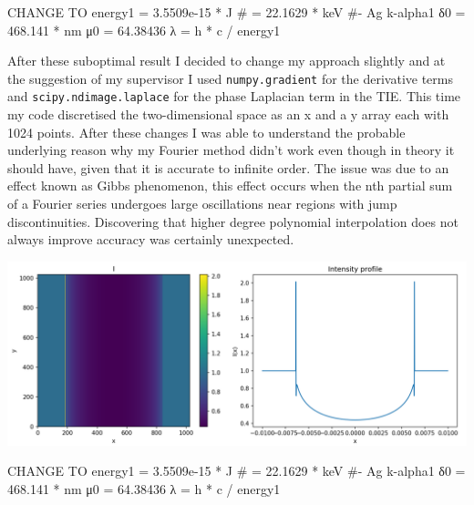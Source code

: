 \documentclass[9pt, a4paper]{article}
\newenvironment{Figure}
    {\par\medskip\noindent\minipage{\linewidth}}
    {\endminipage\par\medskip}
\begin{document}
CHANGE TO
    energy1 = 3.5509e-15 * J #  = 22.1629 * keV #- Ag k-alpha1
    δ0 = 468.141 * nm 
    μ0 = 64.38436 
    λ = h * c / energy1


After these suboptimal result I decided to change my approach slightly and at the suggestion of my supervisor I used \texttt{numpy.gradient} for the derivative terms and \texttt{scipy.ndimage.laplace} for the phase Laplacian term in the TIE. This time my code discretised the two-dimensional space as an x and a y array each with 1024 points. 
After these changes I was able to understand the probable underlying reason why my Fourier method didn't work even though in theory it should have, given that it is accurate to infinite order\cite{Chris}\cite{Fornberg}. The issue was due to an effect known as Gibbs phenomenon, this effect occurs when the nth partial sum of a Fourier series undergoes large oscillations near regions with jump discontinuities\cite{Gibbs}. Discovering that higher degree polynomial interpolation does not always improve accuracy was certainly unexpected.
\begin{Figure}
\centering
\includegraphics[width=\linewidth]{FD_intensity_profile.pdf}
\end{Figure}

CHANGE TO
    energy1 = 3.5509e-15 * J #  = 22.1629 * keV #- Ag k-alpha1
    δ0 = 468.141 * nm 
    μ0 = 64.38436 
    λ = h * c / energy1
\end{document}
